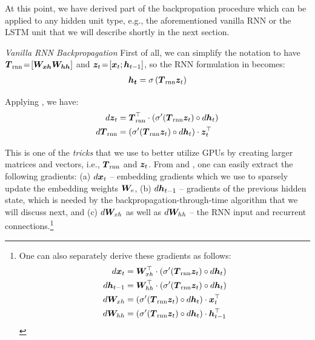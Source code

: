 At this point, we have derived part of the backpropation procedure which can be
applied to any hidden unit type, e.g., the aforementioned vanilla RNN or the
LSTM unit that we will describe shortly in the next section. 

{\it Vanilla RNN Backpropagation} \indent 
First of all, we can simplify the notation to have $\mbox{\boldmath{$T$}}_{\text{rnn}}\!=\![\mbox{\boldmath{$W_{xh}$}}
\mbox{\boldmath{$W_{hh}$}}]$ and $\bm{z}_{t}\!=\![\bm{x}_{t};
\bm{h}_{t-1}]$, so the RNN formulation in  %
becomes:
\begin{align}
\mbox{\boldmath{$h_t$}} = \sigma \left(\mbox{\boldmath{$T$}}_{\text{rnn}} \bm{z}_{t}\right) \label{e:rnn_simplified}
\end{align}

Applying , we have:
\begin{align}
d\bm{z}_{t} &=  \mbox{\boldmath{$T$}}_{\text{rnn}}^\top \cdot
\left(\sigma'(\mbox{\boldmath{$T$}}_{\text{rnn}} \bm{z}_{t}) \circ d\bm{h}_{t}\right) \label{e:grad_zt} \\
d\mbox{\boldmath{$T$}}_{\text{rnn}} &=  \left(\sigma'(\mbox{\boldmath{$T$}}_{\text{rnn}} \bm{z}_{t}) \circ d\bm{h}_{t}\right) \cdot \bm{z}_{t}^\top \label{e:grad_rnn}
\end{align}

This is one of the {\it tricks} that we use to better utilize GPUs by creating
larger matrices and vectors, i.e., $\mbox{\boldmath{$T$}}_{\text{rnn}}$ and $\bm{z}_{t}$. From  and
, one can easily extract the following gradients:
(a) $d\bm{x}_{t}$ -- embedding gradients which we use to sparsely update the embedding weights $\bm{W}_{e}$, (b) $d\bm{h}_{t-1}$
 -- gradients of the previous hidden state, which is needed by the
 backpropagation-through-time algorithm that we will discuss next, and (c) $d\bm{W}_{xh}$ as well
as $d\bm{W}_{hh}$ -- the RNN input and recurrent connections.\footnote{One can also
separately derive these gradients as follows:
\begin{align}
d\bm{x}_{t} &=  \bm{W}_{xh}^\top \cdot \left(\sigma'(\mbox{\boldmath{$T$}}_{\text{rnn}} \bm{z}_{t}) \circ d\bm{h}_{t}\right) \label{e:grad_xt}\\
d\bm{h}_{t-1} &=  \bm{W}_{hh}^\top \cdot \left(\sigma'(\mbox{\boldmath{$T$}}_{\text{rnn}} \bm{z}_{t}) \circ d\bm{h}_{t}\right)\\
d\bm{W}_{xh} &=  \left(\sigma'(\mbox{\boldmath{$T$}}_{\text{rnn}} \bm{z}_{t}) \circ d\bm{h}_{t}\right) \cdot \bm{x}_{t}^\top \\
d\bm{W}_{hh} &=  \left(\sigma'(\mbox{\boldmath{$T$}}_{\text{rnn}} \bm{z}_{t}) \circ d\bm{h}_{t}\right) \cdot \bm{h}_{t-1}^\top \label{e:grad_Whh}
\end{align}
}

